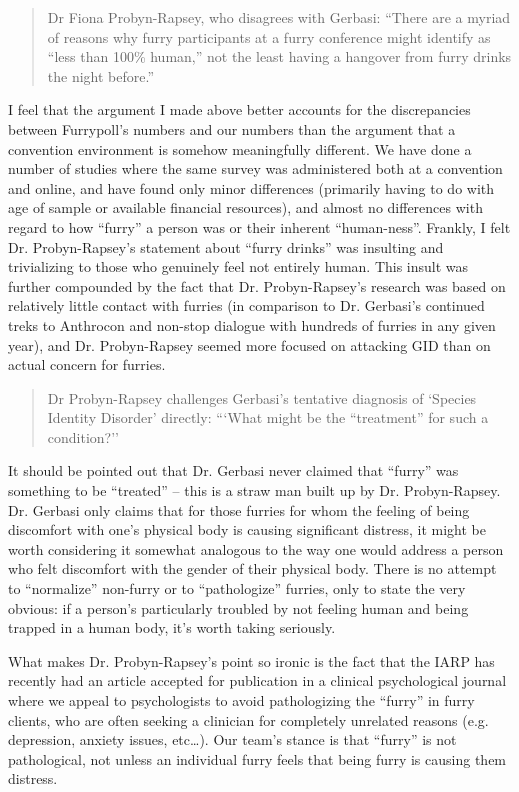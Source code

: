 \begin{quote}
  Dr Fiona Probyn-Rapsey, who disagrees with Gerbasi: ``There are a myriad of reasons why furry participants at a furry conference might identify as ``less than 100\% human,'' not the least having a hangover from furry drinks the night before.''
\end{quote}

I feel that the argument I made above better accounts for the discrepancies between Furrypoll's numbers and our numbers than the argument that a convention environment is somehow meaningfully different. We have done a number of studies where the same survey was administered both at a convention and online, and have found only minor differences (primarily having to do with age of sample or available financial resources), and almost no differences with regard to how ``furry'' a person was or their inherent ``human-ness''. Frankly, I felt Dr. Probyn-Rapsey's statement about ``furry drinks'' was insulting and trivializing to those who genuinely feel not entirely human. This insult was further compounded by the fact that Dr. Probyn-Rapsey's research was based on relatively little contact with furries (in comparison to Dr. Gerbasi's continued treks to Anthrocon and non-stop dialogue with hundreds of furries in any given year), and Dr. Probyn-Rapsey seemed more focused on attacking GID than on actual concern for furries.

\begin{quote}
  Dr Probyn-Rapsey challenges Gerbasi's tentative diagnosis of `Species Identity Disorder' directly: ```What might be the ``treatment'' for such a condition?''
\end{quote}

It should be pointed out that Dr. Gerbasi never claimed that ``furry'' was something to be ``treated'' -- this is a straw man built up by Dr. Probyn-Rapsey. Dr. Gerbasi only claims that for those furries for whom the feeling of being discomfort with one's physical body is causing significant distress, it might be worth considering it somewhat analogous to the way one would address a person who felt discomfort with the gender of their physical body. There is no attempt to ``normalize'' non-furry or to ``pathologize'' furries, only to state the very obvious: if a person's particularly troubled by not feeling human and being trapped in a human body, it's worth taking seriously.

What makes Dr. Probyn-Rapsey's point so ironic is the fact that the IARP has recently had an article accepted for publication in a clinical psychological journal where we appeal to psychologists to avoid pathologizing the ``furry'' in furry clients, who are often seeking a clinician for completely unrelated reasons (e.g. depression, anxiety issues, etc…). Our team's stance is that ``furry'' is not pathological, not unless an individual furry feels that being furry is causing them distress.

